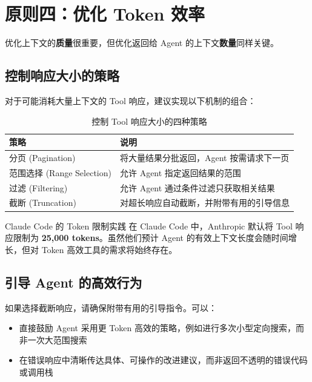 \section{原则四：优化 Token 效率}

优化上下文的\textbf{质量}很重要，但优化返回给 Agent 的上下文\textbf{数量}同样关键。

\subsection{控制响应大小的策略}

对于可能消耗大量上下文的 Tool 响应，建议实现以下机制的组合：

\begin{table}[H]
\centering
\caption{控制 Tool 响应大小的四种策略}
\begin{tabular}{p{}p{}}
\toprule
\textbf{策略} & \textbf{说明} \\
\midrule
分页 (Pagination) & 将大量结果分批返回，Agent 按需请求下一页 \\
\midrule
范围选择 (Range Selection) & 允许 Agent 指定返回结果的范围 \\
\midrule
过滤 (Filtering) & 允许 Agent 通过条件过滤只获取相关结果 \\
\midrule
截断 (Truncation) & 对超长响应自动截断，并附带有用的引导信息 \\
\bottomrule
\end{tabular}
\end{table}

\begin{importantbox}{Claude Code 的 Token 限制实践}
在 Claude Code 中，Anthropic 默认将 Tool 响应限制为 \textbf{25,000 tokens}。虽然他们预计 Agent 的有效上下文长度会随时间增长，但对 Token 高效工具的需求将始终存在。
\end{importantbox}

\subsection{引导 Agent 的高效行为}

如果选择截断响应，请确保附带有用的引导指令。可以：

\begin{itemize}[leftmargin=1.5em]
    \item 直接鼓励 Agent 采用更 Token 高效的策略，例如进行多次小型定向搜索，而非一次大范围搜索
    \item 在错误响应中清晰传达具体、可操作的改进建议，而非返回不透明的错误代码或调用栈
\end{itemize}


